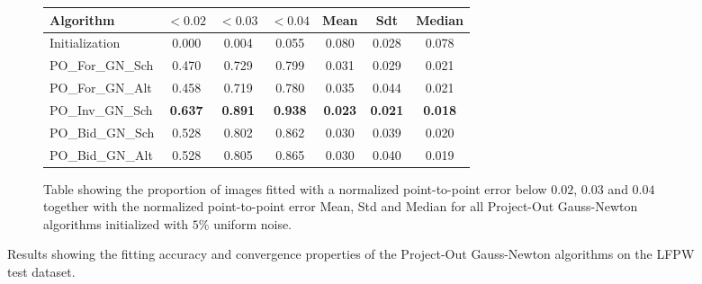 \begin{figure}[p]
\begin{subfigure}{0.48\textwidth}
	    \label{fig:mean_cost_vs_iters2_bpo_gn_5}
	\end{subfigure}
	\par\bigskip\bigskip
	\begin{subfigure}{\textwidth}
		\center
		\begin{tabular}{lcccccc}
		    \toprule
		    Algorithm & $<0.02$ & $<0.03$ & $<0.04$ & Mean & Sdt & Median 
		    \\
		    \midrule
		    Initialization & 0.000 & 0.004 & 0.055 & 0.080 & 0.028 & 0.078
		    \\ 
		    PO\_For\_GN\_Sch & 0.470 & 0.729 & 0.799 & 0.031 & 0.029 & 0.021
		    \\
		    PO\_For\_GN\_Alt & 0.458 & 0.719 & 0.780 & 0.035 & 0.044 & 0.021
		    \\
		    PO\_Inv\_GN\_Sch & \textbf{0.637} & \textbf{0.891} & \textbf{0.938} & \textbf{0.023} & \textbf{0.021} & \textbf{0.018}
		    \\
		    PO\_Bid\_GN\_Sch & 0.528 & 0.802 & 0.862 & 0.030 & 0.039 & 0.020
		    \\
		    PO\_Bid\_GN\_Alt & 0.528 & 0.805 & 0.865 & 0.030 & 0.040 & 0.019
		    \\
		    \bottomrule
	  	\end{tabular}
	  	\caption{Table showing the proportion of images fitted with a normalized point-to-point error below $0.02$, $0.03$ and $0.04$ together with the normalized point-to-point error Mean, Std and Median for all Project-Out Gauss-Newton algorithms initialized with $5\%$ uniform noise.}
	    \label{tab:stats_bpo_gn_5}
	\end{subfigure}
	\caption{Results showing the fitting accuracy and convergence properties of the Project-Out Gauss-Newton algorithms on the LFPW test dataset.}
	\label{fig:bpo_gn_5}
\end{figure}


